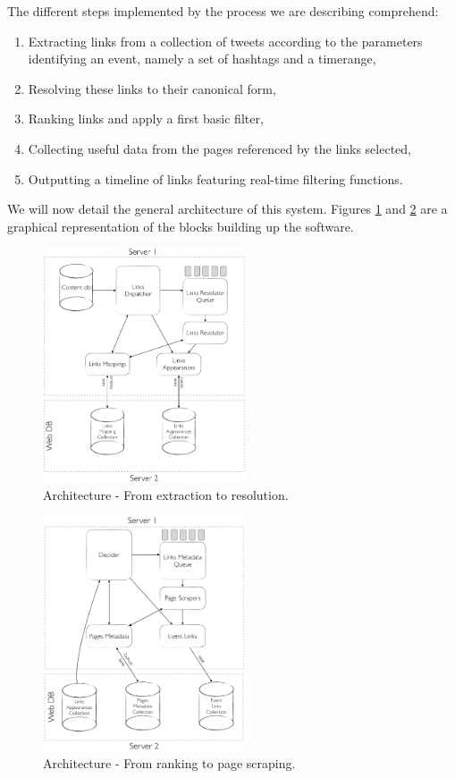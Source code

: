 \documentclass{sig-alternate}
\begin{document}
The different steps implemented by the process we are describing comprehend:
\begin{enumerate}
 \item Extracting links from a collection of tweets according to the parameters identifying an event, namely a set of hashtags and a timerange,
 \item Resolving these links to their canonical form,
 \item Ranking links and apply a first basic filter,
 \item Collecting useful data from the pages referenced by the links selected,
 \item Outputting a timeline of links featuring real-time filtering functions.
\end{enumerate}
We will now detail the general architecture of this system. Figures \ref{fig:architecture_resolution} and \ref{fig:architecture_metadata} are a graphical representation of the blocks building up the software.
\begin{figure}[htbp]
  \centering
  \includegraphics[width=6cm]{Figures/links_processing_architecture_resolution.png}
  \caption{Architecture - From extraction to resolution.}
  \label{fig:architecture_resolution}
\end{figure}
\begin{figure}[htbp]
  \centering
  \includegraphics[width=6cm]{Figures/links_processing_architecture_metadata.png}
  \caption{Architecture - From ranking to page scraping.}
  \label{fig:architecture_metadata}
\end{figure}
\end{document}
